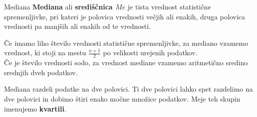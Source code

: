         \begin{frame}
            \begin{alertblock}{Mediana}
                \textbf{Mediana} ali \textbf{središčnica $Me$} je tista vrednost statistične spremenljivke, pri kateri je polovica vrednosti večjih ali enakih,
                druga polovica vrednosti pa manjših ali enakih od te vrednosti.                 
            \end{alertblock}

            \begin{block}{}
                Če imamo liho število vrednosti statistične spremenljivke, za mediano vzamemo vrednost, ki stoji na mestu $\frac{n+1}{2}$ po velikosti urejenih podatkov. \\
                Če je število vrednosti sodo, za vrednost mediane vzamemo aritmetično sredino srednjih dveh podatkov.
            \end{block}

            \begin{block}{}
                Mediana razdeli podatke na dve polovici. Ti dve polovici lahko spet razdelimo na dve polovici in dobimo štiri enako močne množice podatkov. 
                Meje teh skupin imenujemo \textbf{kvartili}.
            \end{block}
        \end{frame}

